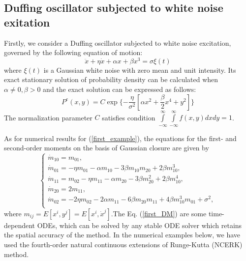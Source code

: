 \documentclass[a4paper, 11pt, final]{article}
\begin{document}
\subsection{Duffing oscillator subjected to white noise exitation}
Firstly, we consider a Duffing oscillator subjected to white noise excitation,
governed by the following equation of motion:
\begin{equation}
    \label{first_example}
    \ddot x + \eta \dot x + \alpha x + \beta {x^3} = \sigma \xi (t)
\end{equation}
where $\xi(t)$ is a Gaussian white noise with zero mean and
unit intensity. Its exact stationary solution of probability density
can be calculated when 
    $ \alpha \neq 0,\beta  > 0 $
and the exact solution can be expressed as follows:
\begin{equation}
    \label{real_result}
    P^e(x,y) = C\exp \{  - \frac{\eta }{{{\sigma ^2}}}[\alpha {x^2} + \frac{\beta }{2}{x^4} + {y^2}]\}
\end{equation}
The normalization parameter $C$ satisfies condition
$\int\limits_{ - \infty }^\infty  {\int\limits_{ - \infty }^\infty  {f(x,y)dxdy = 1} }$.

As for numerical results for (\ref{first_example}), the equations for the first- and 
second-order moments on the basis of Gaussian closure are given by
\begin{equation}
    \label{first_DM}
\left\{
\begin{array}{l}
\dot{m}_{10}=m_{01},\\
\dot{m}_{01}=-\eta m_{01}-\alpha m_{10}-3\beta m_{10}m_{20}+2\beta
m_{10}^3,\\
\dot{m}_{11}=m_{02}-\eta m_{11}-\alpha m_{20}-3\beta
m_{20}^2+2\beta
m_{10}^4,\\
\dot{m}_{20}=2m_{11},\\
\dot{m}_{02}=-2\eta m_{02}-2\alpha m_{11}-6\beta
m_{20}m_{11}+4\beta m_{10}^3 m_{01}
+\sigma^2,\\
\end{array}\right.
\end{equation}
where $m_{ij}=E[x^i,y^j]=E[x^i,\dot{x}^j]$.The Eq. (\ref{first_DM}) are some
time-dependent ODEs, which can be solved by any stable ODE
solver which retains the spatial accuracy of the method. In the
numerical examples below, we have used the fourth-order
natural continuous extensions of Runge-Kutta (NCERK) method.
\end{document}
